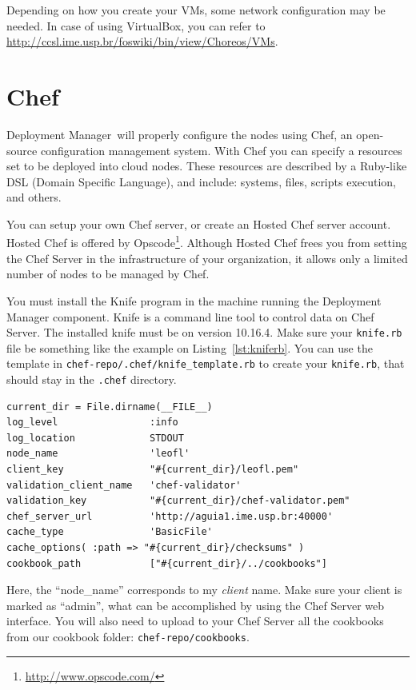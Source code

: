 \documentclass[a4paper, 10pt]{article}
\newcommand{\dm}{Deployment Manager}
\begin{document}
Depending on how you create your VMs, some network configuration may be needed. In case of using VirtualBox, you can refer to \url{http://ccsl.ime.usp.br/foswiki/bin/view/Choreos/VMs}.

\section{Chef}
\label{sec:chef}

\dm\ will properly configure the nodes using Chef, an open-source configuration management system. With Chef you can specify a resources set to be deployed into cloud nodes. These resources are described by a Ruby-like DSL (Domain Specific Language), and include: systems, files, scripts execution, and others.

You can setup your own Chef server, or create an Hosted Chef server account. Hosted Chef is offered by Opscode\footnote{\url{http://www.opscode.com/}}. Although Hosted Chef frees you from setting the Chef Server in the infrastructure of your organization, it allows only a limited number of nodes to be managed by Chef.

You must install the Knife program in the machine running the Deployment Manager component. Knife is a command line tool to control data on Chef Server. The installed knife must be on version 10.16.4. Make sure your \texttt{knife.rb} file be something like the example on Listing~\ref{lst:kniferb}. You can use the template in \texttt{chef-repo/.chef/knife\_template.rb} to create your \texttt{knife.rb}, that should stay in the \texttt{.chef} directory.

{\footnotesize
\begin{lstlisting}[caption=knife.rb example,label=lst:kniferb] 
current_dir = File.dirname(__FILE__)
log_level                :info
log_location             STDOUT
node_name                'leofl'
client_key               "#{current_dir}/leofl.pem"
validation_client_name   'chef-validator'
validation_key           "#{current_dir}/chef-validator.pem"
chef_server_url          'http://aguia1.ime.usp.br:40000'
cache_type               'BasicFile'
cache_options( :path => "#{current_dir}/checksums" )
cookbook_path            ["#{current_dir}/../cookbooks"]
\end{lstlisting}
}

Here, the ``node\_name'' corresponds to my \emph{client} name. Make sure your client is marked as ``admin'', what can be accomplished by using the Chef Server web interface. You will also need to upload to your Chef Server all the cookbooks from our cookbook folder: \texttt{chef-repo/cookbooks}.
\end{document}
